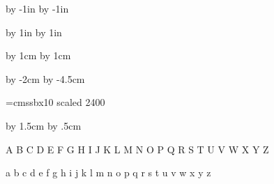 


\nopagenumbers


\vsize=297mm
\hsize=210mm

\parindent=0pt
\parskip=0pt
\baselineskip=0pt
\advance\voffset by -1in
\advance\hoffset by -1in

\advance\vsize by 1in
\advance\hsize by 1in

\advance\voffset by 1cm
\advance\hoffset by 1cm

\advance\vsize by -2cm
\advance\hsize by -4.5cm


\def\epsfsize#1#2{#1}

\font\ssbx=cmssbx10 scaled 2400

\advance\baselineskip by 1.5cm
\advance\parskip by .5cm

\begingroup
\ssbx A B C D E F G H I J K L M N O P Q R S T U V W X Y Z

a b c d e f g h i j k l m n o p q r s t u v w x y z
\endgroup



\bye




